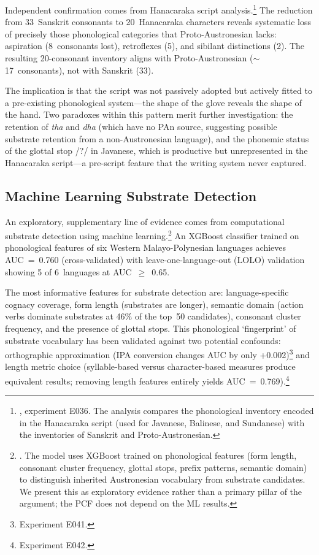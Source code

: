 \documentclass[12pt,a4paper]{article}
\begin{document}
Independent confirmation comes from Hanacaraka script analysis.\footnote{\autocite{amien2026d}, experiment E036. The analysis compares the phonological inventory encoded in the Hanacaraka script (used for Javanese, Balinese, and Sundanese) with the inventories of Sanskrit and Proto-Austronesian.} The reduction from 33~Sanskrit consonants to 20~Hanacaraka characters reveals systematic loss of precisely those phonological categories that Proto-Austronesian lacks: aspiration (8~consonants lost), retroflexes (5), and sibilant distinctions (2). The resulting 20-consonant inventory aligns with Proto-Austronesian ($\sim$17~consonants), not with Sanskrit (33).

The implication is that the script was not passively adopted but actively fitted to a pre-existing phonological system---the shape of the glove reveals the shape of the hand. Two paradoxes within this pattern merit further investigation: the retention of \emph{tha} and \emph{dha} (which have no PAn source, suggesting possible substrate retention from a non-Austronesian language), and the phonemic status of the glottal stop /?/ in Javanese, which is productive but unrepresented in the Hanacaraka script---a pre-script feature that the writing system never captured.

\subsection{Machine Learning Substrate Detection}

An exploratory, supplementary line of evidence comes from computational substrate detection using machine learning.\footnote{\autocite{amien2026d}. The model uses XGBoost trained on phonological features (form length, consonant cluster frequency, glottal stops, prefix patterns, semantic domain) to distinguish inherited Austronesian vocabulary from substrate candidates. We present this as exploratory evidence rather than a primary pillar of the argument; the PCF does not depend on the ML results.} An XGBoost classifier trained on phonological features of six Western Malayo-Polynesian languages achieves AUC~=~0.760 (cross-validated) with leave-one-language-out (LOLO) validation showing 5 of 6~languages at AUC~$\geq$~0.65.

The most informative features for substrate detection are: language-specific cognacy coverage, form length (substrates are longer), semantic domain (action verbs dominate substrates at 46\% of the top~50 candidates), consonant cluster frequency, and the presence of glottal stops. This phonological `fingerprint' of substrate vocabulary has been validated against two potential confounds: orthographic approximation (IPA conversion changes AUC by only +0.002)\footnote{Experiment E041.} and length metric choice (syllable-based versus character-based measures produce equivalent results; removing length features entirely yields AUC~=~0.769).\footnote{Experiment E042.}
\end{document}
